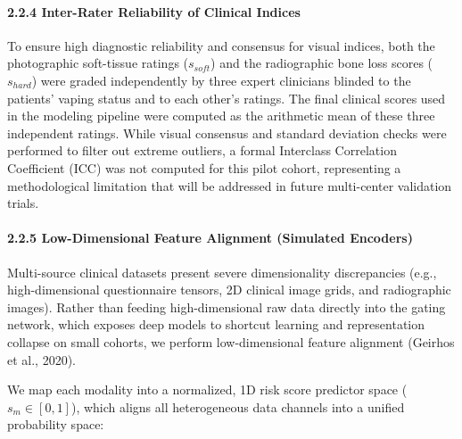 \documentclass[
]{article}
\begin{document}
\paragraph{\texorpdfstring{\textbf{2.2.4 Inter-Rater Reliability of
Clinical
Indices}}{2.2.4 Inter-Rater Reliability of Clinical Indices}}\label{inter-rater-reliability-of-clinical-indices}

To ensure high diagnostic reliability and consensus for visual indices,
both the photographic soft-tissue ratings (\(s_{soft}\)) and the
radiographic bone loss scores (\(s_{hard}\)) were graded independently
by three expert clinicians blinded to the patients' vaping status and to
each other's ratings. The final clinical scores used in the modeling
pipeline were computed as the arithmetic mean of these three independent
ratings. While visual consensus and standard deviation checks were
performed to filter out extreme outliers, a formal Interclass
Correlation Coefficient (ICC) was not computed for this pilot cohort,
representing a methodological limitation that will be addressed in
future multi-center validation trials.

\paragraph{\texorpdfstring{\textbf{2.2.5 Low-Dimensional Feature
Alignment (Simulated
Encoders)}}{2.2.5 Low-Dimensional Feature Alignment (Simulated Encoders)}}\label{low-dimensional-feature-alignment-simulated-encoders}

Multi-source clinical datasets present severe dimensionality
discrepancies (e.g., high-dimensional questionnaire tensors, 2D clinical
image grids, and radiographic images). Rather than feeding
high-dimensional raw data directly into the gating network, which
exposes deep models to shortcut learning and representation collapse on
small cohorts, we perform low-dimensional feature alignment (Geirhos et
al., 2020).

We map each modality into a normalized, 1D risk score predictor space
(\(s_{m} \in [ 0,1]\)), which aligns all heterogeneous data channels
into a unified probability space:
\end{document}
